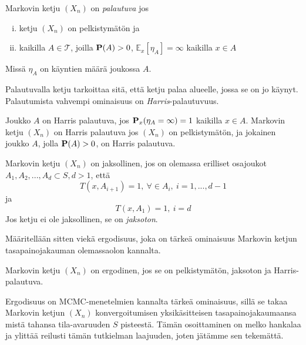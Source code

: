 \begin{maar}
	Markovin ketju $(X_n)$ on \textit{palautuva} jos
	\begin{enumerate}[(i)]
		\item ketju $(X_n)$ on pelkistymätön ja
		\item kaikilla $A\in \mathcal{T}$, joilla $\textbf{P}(A)>0$, $\mathbb{E}_x [\eta_A]=\infty$ kaikilla $x\in A$
	\end{enumerate}
	Missä $\eta_A$ on käyntien määrä joukossa $A$.
\end{maar}

Palautuvalla ketju tarkoittaa sitä, että ketju palaa alueelle, jossa se on jo käynyt. Palautumista vahvempi ominaisuus on \textit{Harris}-palautuvuus.

\begin{maar}
	Joukko $A$ on Harris palautuva, jos $\textbf{P}_x(\eta_A =\infty) = 1$ kaikilla $x\in A$. Markovin ketju $(X_n)$ on Harris palautuva jos $(X_n)$ on pelkistymätön, ja jokainen joukko $A$, jolla $\textbf{P}(A)>0$, on Harris palautuva.
\end{maar}

\begin{maar}
	Markovin ketju $(X_n)$ on jaksollinen, jos on olemassa erilliset osajoukot $A_1, A_2,...,A_d \subset S, d > 1$, että 
	\begin{equation}
		T(x, A_{i+1}) = 1 , \: \forall \in A_i, \: i=1,...,d-1
	\end{equation}
	ja 
	\begin{equation}
		T(x,A_1)=1, \: i = d
	\end{equation}
	Jos ketju ei ole jaksollinen, se on \textit{jaksoton}.
\end{maar}

Määritellään sitten viekä ergodisuus, joka on tärkeä ominaisuus Markovin ketjun tasapainojakauman olemassaolon kannalta.

\begin{maar}
	Markovin ketju $(X_n)$ on ergodinen, jos se on pelkistymätön, jaksoton ja Harris-palautuva.
\end{maar}

Ergodisuus on MCMC-menetelmien kannalta tärkeä ominaisuus, sillä se takaa Markovin ketjun $(X_n)$ konvergoitumisen yksikäsitteisen tasapainojakaumaansa mistä tahansa tila-avaruuden $S$ pisteestä. Tämän osoittaminen on melko hankalaa ja ylittää reilusti tämän tutkielman laajuuden, joten jätämme sen tekemättä.



